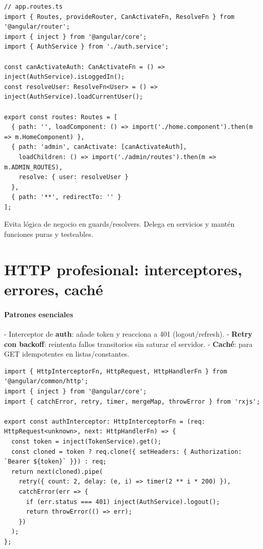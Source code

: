 \documentclass[11pt,a4paper]{article}
\begin{document}
\begin{lstlisting}[style=tsstyle, caption={Definición de rutas standalone con guards funcionales}]
// app.routes.ts
import { Routes, provideRouter, CanActivateFn, ResolveFn } from '@angular/router';
import { inject } from '@angular/core';
import { AuthService } from './auth.service';

const canActivateAuth: CanActivateFn = () => inject(AuthService).isLoggedIn();
const resolveUser: ResolveFn<User> = () => inject(AuthService).loadCurrentUser();

export const routes: Routes = [
  { path: '', loadComponent: () => import('./home.component').then(m => m.HomeComponent) },
  { path: 'admin', canActivate: [canActivateAuth],
    loadChildren: () => import('./admin/routes').then(m => m.ADMIN_ROUTES),
    resolve: { user: resolveUser }
  },
  { path: '**', redirectTo: '' }
];
\end{lstlisting}

\begin{tipbox}
Evita lógica de negocio en guards/resolvers. Delega en servicios y mantén funciones puras y testeables.
\end{tipbox}

\section{HTTP profesional: interceptores, errores, caché}
\paragraph{Patrones esenciales}
- Interceptor de \textbf{auth}: añade token y reacciona a 401 (logout/refresh).
- \textbf{Retry con backoff}: reintenta fallos transitorios sin saturar el servidor.
- \textbf{Caché}: para GET idempotentes en listas/constantes.

\begin{lstlisting}[style=tsstyle, caption={Interceptor de auth y reintento exponencial}]
import { HttpInterceptorFn, HttpRequest, HttpHandlerFn } from '@angular/common/http';
import { inject } from '@angular/core';
import { catchError, retry, timer, mergeMap, throwError } from 'rxjs';

export const authInterceptor: HttpInterceptorFn = (req: HttpRequest<unknown>, next: HttpHandlerFn) => {
  const token = inject(TokenService).get();
  const cloned = token ? req.clone({ setHeaders: { Authorization: `Bearer ${token}` }}) : req;
  return next(cloned).pipe(
    retry({ count: 2, delay: (e, i) => timer(2 ** i * 200) }),
    catchError(err => {
      if (err.status === 401) inject(AuthService).logout();
      return throwError(() => err);
    })
  );
};
\end{lstlisting}
\end{document}
